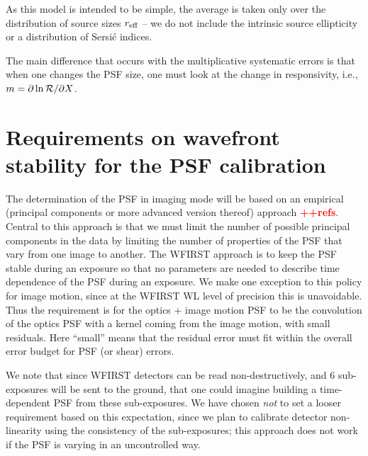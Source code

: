 \documentclass[aps,prd, amsmath,amssymb,superscriptaddress,showkeys,nofootinbib,reprint,preprintnumbers]{revtex4-1}
\newcommand{\verify}[1]{\textcolor{red}{\textbf{{#1}}}}
\begin{document}
\begin{widetext}
As this model is intended to be simple, the average is taken only over
the distribution of source sizes $r_{\rm eff}$ -- we do not include
the intrinsic source ellipticity or a distribution of Sersi\'c
indices.

The main difference that occurs with the multiplicative systematic errors is that when one changes the PSF size, one must look at the change in responsivity, i.e., $m = \partial \ln {\cal R}/\partial X$.


\section{Requirements on wavefront stability for the PSF calibration}
\label{app:psf-stability}

The determination of the PSF in imaging mode will be based on an empirical (principal components or more advanced version thereof) approach \verify{++refs}. Central to this approach is that we must limit the number of possible principal components in the data by limiting the number of properties of the PSF that vary from one image to another. The WFIRST approach is to keep the PSF stable during an exposure so that no parameters are needed to describe time dependence of the PSF during an exposure. We make one exception to this policy for image motion, since at the WFIRST WL level of precision this is unavoidable. Thus the requirement is for the optics + image motion PSF to be the convolution of the optics PSF with a kernel coming from the image motion, with small residuals. Here ``small'' means that the residual error must fit within the overall error budget for PSF (or shear) errors.

We note that since WFIRST detectors can be read non-destructively, and 6 sub-exposures will be sent to the ground, that one could imagine building a time-dependent PSF from these sub-exposures. We have chosen {\em not} to set a looser requirement based on this expectation, since we plan to calibrate detector non-linearity using the consistency of the sub-exposures; this approach does not work if the PSF is varying in an uncontrolled way.


\end{widetext}
\end{document}

